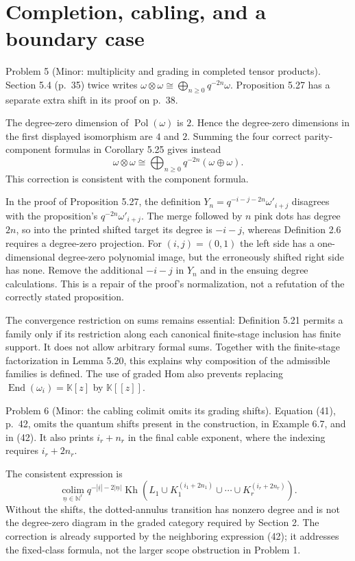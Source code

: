 \documentclass[10pt]{article}
\begin{document}
\section*{Completion, cabling, and a boundary case}
Problem 5 (Minor: multiplicity and grading in completed tensor products).  Section 5.4 (p. 35) twice writes \(\omega\otimes\omega\cong\bigoplus_{n\geq0}q^{-2n}\omega\). Proposition 5.27 has a separate extra shift in its proof on p. 38.\par
The degree-zero dimension of \(\operatorname{Pol}(\omega)\) is \(2\). Hence the degree-zero dimensions in the first displayed isomorphism are \(4\) and \(2\). Summing the four correct parity-component formulas in Corollary 5.25 gives instead \[\omega\otimes\omega
 \cong\bigoplus_{n\geq0}q^{-2n}(\omega\oplus\omega).\] This correction is consistent with the component formula.\par
In the proof of Proposition 5.27, the definition \(Y_n=q^{-i-j-2n}\omega'_{i+j}\) disagrees with the proposition’s \(q^{-2n}\omega'_{i+j}\). The merge followed by \(n\) pink dots has degree \(2n\), so into the printed shifted target its degree is \(-i-j\), whereas Definition 2.6 requires a degree-zero projection. For \((i,j)=(0,1)\) the left side has a one-dimensional degree-zero polynomial image, but the erroneously shifted right side has none. Remove the additional \(-i-j\) in \(Y_n\) and in the ensuing degree calculations. This is a repair of the proof’s normalization, not a refutation of the correctly stated proposition.\par
The convergence restriction on sums remains essential: Definition 5.21 permits a family only if its restriction along each canonical finite-stage inclusion has finite support. It does not allow arbitrary formal sums. Together with the finite-stage factorization in Lemma 5.20, this explains why composition of the admissible families is defined. The use of graded Hom also prevents replacing \(\operatorname{End}(\omega_i)=\mathbb K[z]\) by \(\mathbb K[[z]]\).\par
Problem 6 (Minor: the cabling colimit omits its grading shifts).  Equation (41), p. 42, omits the quantum shifts present in the construction, in Example 6.7, and in (42). It also prints \(i_r+n_r\) in the final cable exponent, where the indexing requires \(i_r+2n_r\).\par
The consistent expression is \[\operatorname*{colim}_{\underline n\in\mathbb N^r}
 q^{-|\underline i|-2|\underline n|}
 \operatorname{Kh}\!\left(L_1\cup
 K_1^{(i_1+2n_1)}\cup\cdots\cup
 K_r^{(i_r+2n_r)}\right).\] Without the shifts, the dotted-annulus transition has nonzero degree and is not the degree-zero diagram in the graded category required by Section 2. The correction is already supported by the neighboring expression (42); it addresses the fixed-class formula, not the larger scope obstruction in Problem 1.\par
\end{document}
